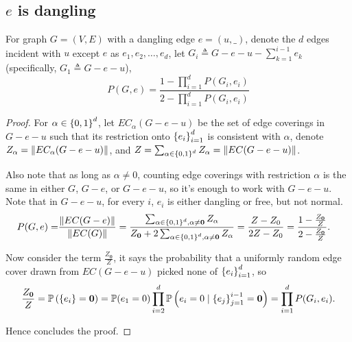 \subsection{$e$ is dangling}
\begin{Lem}
For graph $G=(V,E)$ with a dangling edge $e=(u,\_)$, denote the $d$
edges incident with $u$ except $e$ as $e_1, e_2, \ldots, e_d$,
let $G_i \triangleq G - e - u - \sum_{k=1}^{i-1} e_k$ (specifically, $G_1 \triangleq G - e - u$),
	\begin{equation}
		P(G, e) = \frac{1-\prod_{i=1}^d P(G_i, e_i)}{2 - \prod_{i=1}^d P(G_i, e_i)} %
		\label{propp3rg}
	\end{equation}
\end{Lem}
\begin{proof}
	For $\alpha \in \left\{0,1\right\}^d$, let $EC_{\alpha}(G-e-u)$ be the set of edge coverings in $G-e-u$ such that its restriction onto $\left\{e_i\right\}_{i=1}^{d}$ is consistent with $\alpha$, denote $Z_{\alpha} = \left\Vert EC_{\alpha}(G-e-u)\right\Vert$, and $Z = \sum_{\alpha \in \left\{0,1\right\}^d} Z_{\alpha} = \left\Vert EC(G-e-u)\right\Vert$. %

		Also note that as long as $\alpha \neq 0$, counting edge coverings with restriction $\alpha$ is the same in either $G$, $G-e$, or $G-e-u$, so it's enough to work with $G-e-u$. Note that in $G-e-u$, for every $i$, $e_i$ is either dangling or free, but not normal.
	\begin{align*}
		P(G,e) = & \frac{\left\Vert EC(G-e)\right\Vert}{\left\Vert EC(G)\right\Vert}
		= \frac{\sum_{\alpha \in \left\{0,1\right\}^d, \alpha \neq \mathbf{0}} Z_{\alpha} }{ Z_{\mathbf{0}} + 2 \sum_{\alpha \in \left\{0,1\right\}^d, \alpha \neq \mathbf{0}} Z_{\alpha}}
		=\frac{Z - Z_0}{2 Z - Z_0}
		= \frac{1 - \frac{Z_{\mathbf{0}}}{Z}}{ 2 - \frac{Z_{\mathbf{0}}}{Z}}.
	\end{align*}

	Now consider the term $\frac{Z_{\mathbf{0}}}{Z}$, it says the probability that a uniformly random edge cover drawn from $EC(G-e-u)$ picked none of $\left\{e_i\right\}_{i=1}^{d}$, so
	\begin{align*}
		\frac{Z_{\mathbf{0}}}{Z}=\mathbb{P} \left( \left\{e_i\right\} = \mathbf{0}\right) = \mathbb{P} (e_1 = 0) \prod_{i=2}^d \mathbb{P} \left(e_i = 0 \mid \left\{e_j\right\}_{j=1}^{i-1} = \mathbf{0}\right) = \prod_{i=1}^d P(G_i, e_i).
	\end{align*}

	Hence concludes the proof.
	
\end{proof}


